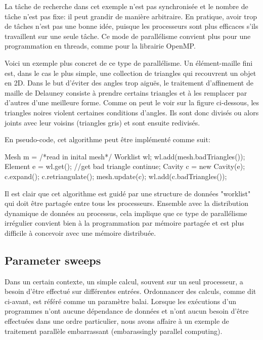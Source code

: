 	La tâche de recherche dans cet exemple n'est pas synchronisée et le nombre de tâche n'est pas fixe: il peut grandir de manière arbitraire. En pratique, avoir trop de tâches n'est pas une bonne idée, puisque les processeurs sont plus efficaces s'ils travaillent sur une seule tâche. Ce mode de parallélisme convient plus pour une programmation en threads, comme pour la librairie OpenMP.
	
	Voici un exemple plus concret de ce type de parallélisme. Un élément-maille fini est, dans le cas le plus simple, une collection de triangles qui recouvrent un objet en 2D. Dans le but d'éviter des angles trop aiguës, le traitement d'affinement de maille de Delauney consiste à prendre certains triangles et à les remplacer par d'autres d'une meilleure forme. Comme on peut le voir sur la figure ci-dessous, les triangles noires violent certaines conditions d'angles. Ils sont donc divisés ou alors joints avec leur voisins (triangles gris) et sont ensuite redivisés.
	
	
	En pseudo-code, cet algorithme peut être implémenté comme suit:\\
	
	\begin{algorithmic}
	\STATE Mesh m = /*read in inital mesh*/
	\STATE Worklist wl;
	\STATE wl.add(mesh.badTriangles());
		\STATE Element e = wl.get(); //get bad triangle
			\STATE continue;
		\ENDIF
		\STATE Cavity c = new Cavity(e);
		\STATE c.expand();
		\STATE c.retriangulate();
		\STATE mesh.update(c);
		\STATE wl.add(c.badTriangles());
	\ENDWHILE  
	\end{algorithmic}
	
	Il est clair que cet algorithme est guidé par une structure de données "worklist" qui doit être partagée entre tous les processeurs. Ensemble avec la distribution dynamique de données au processus, cela implique que ce type de parallélisme irrégulier convient bien à la programmation par mémoire partagée et est plus difficile à concevoir avec une mémoire distribuée.
	
	\subsection{Parameter sweeps}
	Dans un certain contexte, un simple calcul, souvent sur un seul processeur, a besoin d'être effectué sur différentes entrées. Ordonnancer des calculs, comme dit ci-avant, est référé comme un paramètre balai. Lorsque les exécutions d'un programmes n'ont aucune dépendance de données et n'ont aucun besoin d'être effectuées dans une ordre particulier, nous avons affaire à un exemple de traitement parallèle embarrassant (embarassingly parallel computing).
	
